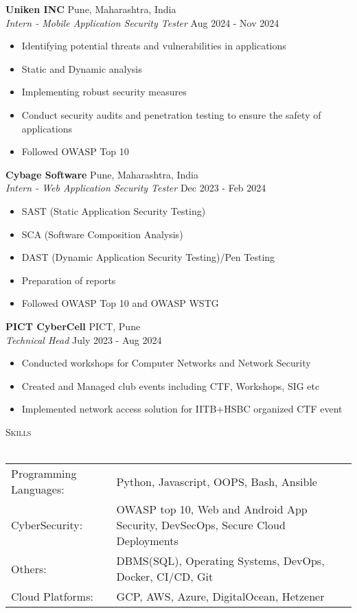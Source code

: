 \documentclass[a4paper]{article}
\newcommand{\lineunder} {
    \vspace*{-8pt} \\
    \hspace*{-18pt} \hrulefill \\
}
\newcommand{\header} [1] {
    {\hspace*{-18pt}\vspace*{6pt} \textsc{#1}}
    \vspace*{-6pt} \lineunder
}
\begin{document}
\textbf{Uniken INC} \hfill Pune, Maharashtra, India\\
\textit{Intern - Mobile Application Security Tester} \hfill Aug 2024 - Nov 2024\\
\vspace{-1mm}
\begin{itemize} \itemsep 1pt
	\item Identifying potential threats and vulnerabilities in applications
	\item Static and Dynamic analysis
	\item Implementing robust security measures
	\item Conduct security audits and penetration testing to ensure the safety of applications
	\item Followed OWASP Top 10
\end{itemize}
\textbf{Cybage Software} \hfill Pune, Maharashtra, India\\
\textit{Intern - Web Application Security Tester} \hfill Dec 2023 - Feb 2024\\
\vspace{-1mm}
\begin{itemize} \itemsep 1pt
	\item SAST (Static Application Security Testing)
	\item SCA (Software Composition Analysis)
	\item DAST (Dynamic Application Security Testing)/Pen Testing
	\item Preparation of reports
	\item Followed OWASP Top 10 and OWASP WSTG
\end{itemize}
\textbf{PICT CyberCell} \hfill PICT, Pune\\
\textit{Technical Head} \hfill July 2023 - Aug 2024\\
\vspace{-1mm}
\begin{itemize} \itemsep 1pt
	\item Conducted workshops for Computer Networks and Network Security
	\item Created and Managed club events including CTF, Workshops, SIG etc
	\item Implemented network access solution for IITB+HSBC organized CTF event
\end{itemize}

\header{Skills}
\begin{tabular}{ l l }
	Programming Languages: & Python, Javascript, OOPS, Bash, Ansible                                         \\
	CyberSecurity:         & OWASP top 10, Web and Android App Security, DevSecOps, Secure Cloud Deployments \\
	Others:                & DBMS(SQL), Operating Systems, DevOps, Docker, CI/CD, Git                        \\
	Cloud Platforms:       & GCP, AWS, Azure, DigitalOcean, Hetzener                                         \\
\end{tabular}
\vspace{2mm}
\end{document}
